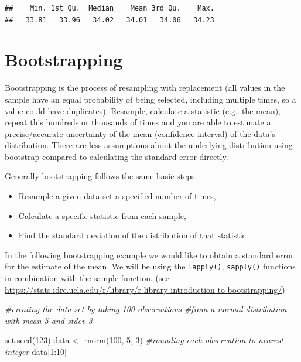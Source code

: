 \documentclass[
]{book}
\newenvironment{Shaded}{\begin{snugshade}}{\end{snugshade}}
\newcommand{\CommentTok}[1]{\textcolor[rgb]{0.56,0.35,0.01}{\textit{#1}}}
\newcommand{\DecValTok}[1]{\textcolor[rgb]{0.00,0.00,0.81}{#1}}
\newcommand{\FunctionTok}[1]{\textcolor[rgb]{0.00,0.00,0.00}{#1}}
\newcommand{\NormalTok}[1]{#1}
\newcommand{\OtherTok}[1]{\textcolor[rgb]{0.56,0.35,0.01}{#1}}
\newcommand{\SpecialCharTok}[1]{\textcolor[rgb]{0.00,0.00,0.00}{#1}}
\providecommand{\tightlist}{%
  \setlength{\itemsep}{0pt}\setlength{\parskip}{0pt}}
\theoremstyle{definition}
\theoremstyle{definition}
\theoremstyle{definition}
\theoremstyle{definition}
\theoremstyle{remark}
\begin{document}
\begin{verbatim}
##    Min. 1st Qu.  Median    Mean 3rd Qu.    Max. 
##   33.81   33.96   34.02   34.01   34.06   34.23
\end{verbatim}

\hypertarget{bootstrapping}{%
\section{Bootstrapping}\label{bootstrapping}}

Bootstrapping is the process of resampling with replacement (all values in the sample have an equal probability of being selected, including multiple times, so a value could have duplicates). Resample, calculate a statistic (e.g.~the mean), repeat this hundreds or thousands of times and you are able to estimate a precise/accurate uncertainty of the mean (confidence interval) of the data's distribution. There are less assumptions about the underlying distribution using bootstrap compared to calculating the standard error directly.

Generally bootstrapping follows the same basic steps:

\begin{itemize}
\tightlist
\item
  Resample a given data set a specified number of times,\\
\item
  Calculate a specific statistic from each sample,\\
\item
  Find the standard deviation of the distribution of that statistic.
\end{itemize}

In the following bootstrapping example we would like to obtain a standard error for the estimate of the mean. We will be using the \texttt{lapply()}, \texttt{sapply()} functions in combination with the sample function. (see \url{https://stats.idre.ucla.edu/r/library/r-library-introduction-to-bootstrapping/})\citep{UCLA_2021}

\begin{Shaded}
\begin{Highlighting}[]
\CommentTok{\#creating the data set by taking 100 observations }
\CommentTok{\#from a normal distribution with mean 5 and stdev 3}

\FunctionTok{set.seed}\NormalTok{(}\DecValTok{123}\NormalTok{)}
\NormalTok{data }\OtherTok{\textless{}{-}} \FunctionTok{rnorm}\NormalTok{(}\DecValTok{100}\NormalTok{, }\DecValTok{5}\NormalTok{, }\DecValTok{3}\NormalTok{) }\CommentTok{\#rounding each observation to nearest integer}
\NormalTok{data[}\DecValTok{1}\SpecialCharTok{:}\DecValTok{10}\NormalTok{]}
\end{Highlighting}
\end{Shaded}
\end{document}
